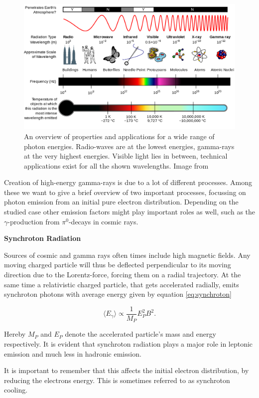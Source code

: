 \begin{figure}
	\centering
	\includegraphics[width=.6\textwidth]{images/em_spectrum.png}
	\caption{An overview of properties and applications for a wide 
		range of photon energies.
		Radio-waves are at the lowest energies, gamma-rays 
		at the very highest energies.
		Visible light lies in between, technical 
		applications exist for all the shown wavelengths.
		Image from \cite{wiki_em}}
	\label{fig:em_spectrum}
\end{figure}

Creation of high-energy gamma-rays is due to a lot of 
different processes. Among these we want to give a brief 
overview of two important processes, focussing on 
photon emission from an initial pure electron distribution. 
Depending on the studied case other emission factors 
might play important roles as well, such as 
the $\gamma$-production from $\pi^0$-decays in cosmic rays.

\textbf{Synchroton Radiation}

Sources of cosmic and gamma rays often times include 
high magnetic fields. Any moving charged particle will thus be
deflected perpendicular to its moving direction
due to the Lorentz-force, forcing them on a radial trajectory.
At the same time a relativistic charged particle, 
that gets accelerated radially, emits synchroton 
photons with average energy given by 
equation \ref{eq:synchroton}

\begin{equation}
	\langle E_{\gamma} \rangle \propto \frac{1}{M_P} E_P^2 B^2.
	\label{eq:synchroton}
\end{equation}

Hereby $M_P$ and $E_P$ denote the accelerated particle's 
mass and energy respectively. It is evident that 
synchroton radiation plays a major role in leptonic 
emission and much less in hadronic emission.

It is important to remember that this affects the 
initial electron distribution, by reducing the electrons energy.
This is sometimes referred to as synchroton cooling.

